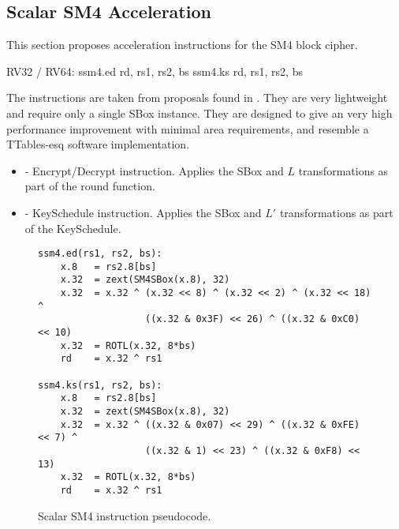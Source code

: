 
\newpage
\subsection{Scalar SM4 Acceleration}
\label{sec:scalar:sm4}

This section proposes acceleration instructions for
the SM4 block cipher\cite{block:sm4:1, ietf:sm4}.

\begin{cryptoisa}
RV32 / RV64:
    ssm4.ed     rd, rs1, rs2, bs
    ssm4.ks     rd, rs1, rs2, bs
\end{cryptoisa}

The instructions are taken from proposals found in \cite{MJS:LWAES:20}.
They are very lightweight and require only a single SBox instance.
They are designed to give an very high performance improvement with
minimal area requirements, and resemble a TTables-esq
software implementation.

\begin{itemize}
\item {} - Encrypt/Decrypt instruction. Applies the
    SBox and $L$ transformations as part of the round function.
\item {} - KeySchedule instruction. Applies the
    SBox and $L'$ transformations as part of the KeySchedule.
\end{itemize}

\begin{figure}[h]
\begin{lstlisting}[language=pseudo]
ssm4.ed(rs1, rs2, bs):
    x.8   = rs2.8[bs]
    x.32  = zext(SM4SBox(x.8), 32)
    x.32  = x.32 ^ (x.32 << 8) ^ (x.32 << 2) ^ (x.32 << 18) ^
                   ((x.32 & 0x3F) << 26) ^ ((x.32 & 0xC0) << 10)
    x.32  = ROTL(x.32, 8*bs)
    rd    = x.32 ^ rs1

ssm4.ks(rs1, rs2, bs):
    x.8   = rs2.8[bs]
    x.32  = zext(SM4SBox(x.8), 32)
    x.32  = x.32 ^ ((x.32 & 0x07) << 29) ^ ((x.32 & 0xFE) << 7) ^
                   ((x.32 & 1) << 23) ^ ((x.32 & 0xF8) << 13)
    x.32  = ROTL(x.32, 8*bs)
    rd    = x.32 ^ rs1
\end{lstlisting}
\caption{Scalar SM4 instruction pseudocode.}
\end{figure}

